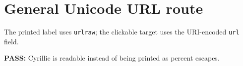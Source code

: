 \documentclass{article}
\begin{document}
\section*{General Unicode URL route}

The printed label uses \texttt{urlraw}; the clickable target uses the
URI-encoded \texttt{url} field.

\nocite{Wiki:SLAM}
\printbibliography[heading=none]

\medskip
\noindent
\textcolor{green!45!black}{\bfseries PASS:}
Cyrillic is readable instead of being printed as percent escapes.
\end{document}
